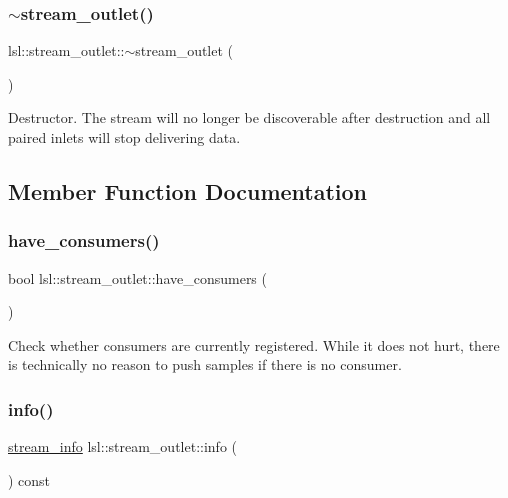 \subsubsection{\texorpdfstring{$\sim$stream\+\_\+outlet()}{~stream\_outlet()}}
{\footnotesize\ttfamily lsl\+::stream\+\_\+outlet\+::$\sim$stream\+\_\+outlet (\begin{DoxyParamCaption}{ }\end{DoxyParamCaption})\hspace{0.3cm}{\ttfamily [inline]}}

Destructor. The stream will no longer be discoverable after destruction and all paired inlets will stop delivering data. 

\subsection{Member Function Documentation}
\mbox{\label{classlsl_1_1stream__outlet_a3e7fad1010ef7c78bcd006a4f94381fa}} 
\subsubsection{\texorpdfstring{have\+\_\+consumers()}{have\_consumers()}}
{\footnotesize\ttfamily bool lsl\+::stream\+\_\+outlet\+::have\+\_\+consumers (\begin{DoxyParamCaption}{ }\end{DoxyParamCaption})\hspace{0.3cm}{\ttfamily [inline]}}

Check whether consumers are currently registered. While it does not hurt, there is technically no reason to push samples if there is no consumer. \mbox{\label{classlsl_1_1stream__outlet_af6fda8eb922b27ae3ed98651934243fe}} 
\subsubsection{\texorpdfstring{info()}{info()}}
{\footnotesize\ttfamily \hyperlink{classlsl_1_1stream__info}{stream\+\_\+info} lsl\+::stream\+\_\+outlet\+::info (\begin{DoxyParamCaption}{ }\end{DoxyParamCaption}) const\hspace{0.3cm}{\ttfamily [inline]}}

